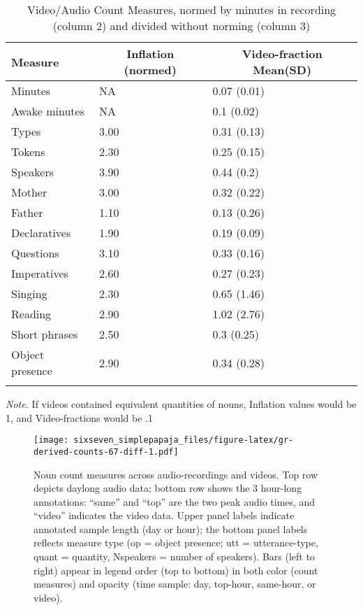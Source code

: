 \documentclass[man]{apa6}
\theoremstyle{definition}
\theoremstyle{definition}
\theoremstyle{definition}
\theoremstyle{remark}
\begin{document}
\begin{table}[tbp]
\begin{center}
\begin{threeparttable}
\caption{\label{tab:normtable}Video/Audio Count Measures, normed by minutes in recording (column 2) and divided without norming (column 3)}
\small{
\begin{tabular}{lll}
\toprule
Measure & \multicolumn{1}{c}{Inflation (normed)} & \multicolumn{1}{c}{Video-fraction Mean(SD)}\\
\midrule
Minutes & NA & 0.07 (0.01)\\
Awake minutes & NA & 0.1 (0.02)\\
Types & 3.00 & 0.31 (0.13)\\
Tokens & 2.30 & 0.25 (0.15)\\
Speakers & 3.90 & 0.44 (0.2)\\
Mother & 3.00 & 0.32 (0.22)\\
Father & 1.10 & 0.13 (0.26)\\
Declaratives & 1.90 & 0.19 (0.09)\\
Questions & 3.10 & 0.33 (0.16)\\
Imperatives & 2.60 & 0.27 (0.23)\\
Singing & 2.30 & 0.65 (1.46)\\
Reading & 2.90 & 1.02 (2.76)\\
Short phrases & 2.50 & 0.3 (0.25)\\
Object presence & 2.90 & 0.34 (0.28)\\
\bottomrule
\addlinespace
\end{tabular}
}
\begin{tablenotes}[para]
\textit{Note.} If videos contained equivalent quantities of nouns, Inflation values would be 1, and Video-fractions would be .1
\end{tablenotes}
\end{threeparttable}
\end{center}
\end{table}

\begin{figure}
\centering
\texttt{[image: sixseven\_simplepapaja\_files/figure-latex/gr-derived-counts-67-diff-1.pdf]}
\caption{\label{fig:gr-derived-counts-67-diff}Noun count measures across
audio-recordings and videos. Top row depicts daylong audio data; bottom
row shows the 3 hour-long annotations: \enquote{same} and \enquote{top}
are the two peak audio times, and \enquote{video} indicates the video
data. Upper panel labels indicate annotated sample length (day or hour);
the bottom panel labels reflects measure type (op = object presence; utt
= utterance-type, quant = quantity, Nspeakers = number of speakers).
Bars (left to right) appear in legend order (top to bottom) in both
color (count measures) and opacity (time sample: day, top-hour,
same-hour, or video).}
\end{figure}
\end{document}
